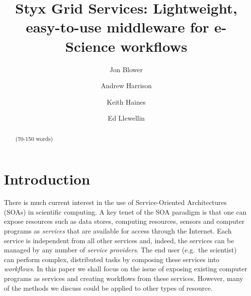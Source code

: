 \documentclass{llncs}
\begin{document}
%
\title{Styx Grid Services: Lightweight, easy-to-use middleware for e-Science workflows}
%
%
\author{Jon Blower \and Andrew Harrison
\and Keith Haines \and Ed Llewellin}
%
%
%

\maketitle              %

\begin{abstract}
(70-150 words)
\end{abstract}
%
\section{Introduction}
There is much current interest in the use of Service-Oriented Architectures (SOAs) in scientific computing.  A key tenet of the SOA paradigm is that one can expose resources such as data stores, computing resources, sensors and computer programs as {\em services} that are available for access through the Internet.  Each service is independent from all other services and, indeed, the services can be managed by any number of {\em service providers}.  The end user (e.g.\ the scientist) can perform complex, distributed tasks by composing these services into {\em workflows}.  In this paper we shall focus on the issue of exposing existing computer programs as services and creating workflows from these services.  However, many of the methods we discuss could be applied to other types of resource.
\end{document}
